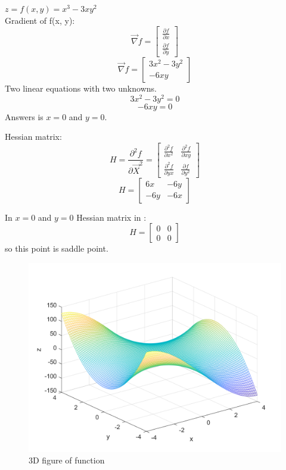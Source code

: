 $z = f(x, y) = x^3 - 3xy^2$ \\
Gradient of f(x, y):
$$\vec{\nabla} f = \begin{bmatrix}
	\frac{\partial f}{\partial x} \\[6pt]
	\frac{\partial f}{\partial y}
\end{bmatrix} $$
$$\vec{\nabla} f = \begin{bmatrix}
	3x^2 - 3y^2 \\
	-6xy
\end{bmatrix} $$
Two linear equations with two unknowns.
$$	3x^2 - 3y^2 =  0 $$
$$-6xy = 0$$
Answers is $x = 0$ and $y = 0$.


Hessian matrix:
$$H = \frac{\partial^2 f}{\partial \vec{X}^2} = \begin{bmatrix}
	\frac{\partial^2 f}{\partial x^2} & \frac{\partial^2 f}{\partial xy} \\[6pt]
	\frac{\partial^2 f}{\partial yx}  & \frac{\partial f}{\partial y^2}
\end{bmatrix} $$
$$H = \begin{bmatrix}
	6x & -6y \\
   -6y & -6x
\end{bmatrix}$$



In $x = 0$ and $y = 0$ Hessian matrix in :
$$H = \begin{bmatrix}
	0 & 0 \\
	0 & 0
\end{bmatrix}$$
so this point is saddle point.
\begin{figure}[H]
	\caption{3D figure of function}
	\centering
	\includegraphics[width=12cm]{Q1/figures/3DplotQ1b.png}
\end{figure}


